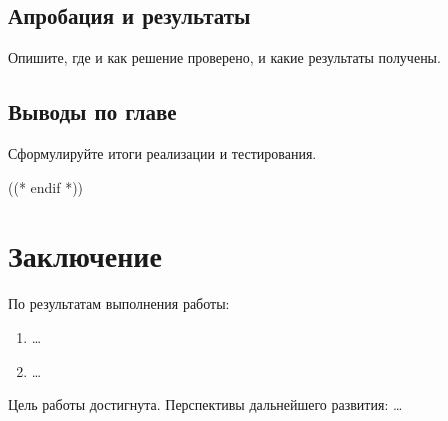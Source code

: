 \documentclass[12pt,a4paper]{extreport}
\begin{document}
\section{Апробация и результаты}
Опишите, где и как решение проверено, и какие результаты получены.

\section{Выводы по главе}
Сформулируйте итоги реализации и тестирования.

\clearpage
((* endif *))

\chapter*{Заключение}

По результатам выполнения работы:
\begin{enumerate}[label=\arabic*), leftmargin=1.25cm]
  \item \ldots\ %
  \item \ldots\ %
\end{enumerate}

Цель работы достигнута. Перспективы дальнейшего развития: \ldots

\clearpage
\end{document}
